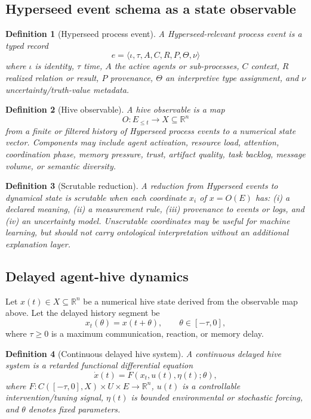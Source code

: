 \documentclass[11pt]{article}
\newtheorem{definition}{Definition}
\begin{document}
\subsection{Hyperseed event schema as a state observable}

\begin{definition}[Hyperseed process event]
A Hyperseed-relevant process event is a typed record
\[
  e = \langle \iota, \tau, A, C, R, P, \Theta, \nu \rangle
\]
where $\iota$ is identity, $\tau$ time, $A$ the active agents or sub-processes,
$C$ context, $R$ realized relation or result, $P$ provenance, $\Theta$ an
interpretive type assignment, and $\nu$ uncertainty/truth-value metadata.
\end{definition}

\begin{definition}[Hive observable]
A hive observable is a map
\[
  O : E_{\le t} \to X \subseteq \mathbb R^n
\]
from a finite or filtered history of Hyperseed process events to a numerical
state vector.  Components may include agent activation, resource load, attention,
coordination phase, memory pressure, trust, artifact quality, task backlog,
message volume, or semantic diversity.
\end{definition}

\begin{definition}[Scrutable reduction]
A reduction from Hyperseed events to dynamical state is scrutable when each
coordinate $x_i$ of $x=O(E)$ has: (i) a declared meaning, (ii) a measurement rule,
(iii) provenance to events or logs, and (iv) an uncertainty model.  Unscrutable
coordinates may be useful for machine learning, but should not carry ontological
interpretation without an additional explanation layer.
\end{definition}

\subsection{Delayed agent-hive dynamics}

Let $x(t)\in X\subseteq\mathbb R^n$ be a numerical hive state derived from the
observable map above.  Let the delayed history segment be
\[
  x_t(\theta)=x(t+\theta),\qquad \theta\in[-\tau,0],
\]
where $\tau\ge0$ is a maximum communication, reaction, or memory delay.

\begin{definition}[Continuous delayed hive system]
A continuous delayed hive system is a retarded functional differential equation
\[
  \dot x(t)=F(x_t,u(t),\eta(t);\theta),
\]
where $F:C([ -\tau,0],X)\times U\times E\to\mathbb R^n$, $u(t)$ is a controllable
intervention/tuning signal, $\eta(t)$ is bounded environmental or stochastic
forcing, and $\theta$ denotes fixed parameters.
\end{definition}
\end{document}
